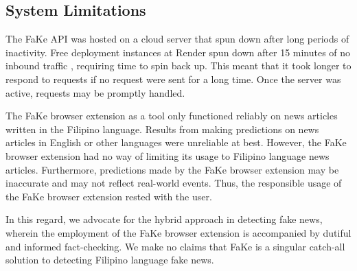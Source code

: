 \subsection{System Limitations}

The FaKe API was hosted on a cloud server that spun down after long periods of inactivity. Free deployment instances at Render spun down after 15 minutes of no inbound traffic \cite{render-docs}, requiring time to spin back up. This meant that it took longer to respond to requests if no request were sent for a long time. Once the server was active, requests may be promptly handled.

The FaKe browser extension as a tool only functioned reliably on news articles written in the Filipino language. Results from making predictions on news articles in English or other languages were unreliable at best. However, the FaKe browser extension had no way of limiting its usage to Filipino language news articles. Furthermore, predictions made by the FaKe browser extension may be inaccurate and may not reflect real-world events. Thus, the responsible usage of the FaKe browser extension rested with the user.

In this regard, we advocate for the hybrid approach in detecting fake news, wherein the employment of the FaKe browser extension is accompanied by dutiful and informed fact-checking. We make no claims that FaKe is a singular catch-all solution to detecting Filipino language fake news.

